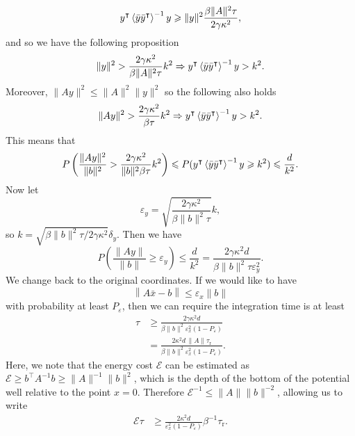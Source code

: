 \documentclass[prx,onecolumn,floatfix,longbibliography,notitlepage, nofootinbib,12pt]{revtex4-2}
\renewcommand{\geq}{\geqslant}
\renewcommand{\leq}{\leqslant}
\begin{document}
\begin{appendix}
\begin{equation}
y^\intercal \braket{\bar{y} \bar{y}^\intercal}^{-1} y \geq \|y\|^2\frac{\beta\|A\|^2\tau}{2 \gamma \kappa^2 },
\end{equation}
and so we have the following proposition
\begin{equation}
    \|y\|^2 > \frac{2 \gamma\kappa^2}{\beta\|A\|^2\tau}k^2 \Rightarrow
    y^\intercal \braket{\bar{y} \bar{y}^\intercal}^{-1}y > k^2.
\end{equation}
Moreover, $\|Ay\|^2 \leq \|A\|^2 \|y\|^2$ so the following also holds
\begin{equation}
    \|A y\|^2 > \frac{2 \gamma\kappa^2}{\beta\tau}k^2 \Rightarrow
    y^\intercal \braket{\bar{y} \bar{y}^\intercal}^{-1}y > k^2.
\end{equation}
This means that 
\begin{equation}
    P\left(  \frac{\|A y\|^2}{\|b\|^2} > \frac{2 \gamma\kappa^2}{\|b\|^2\beta\tau}k^2\right) \leq P( y^\intercal \braket{\bar{y} \bar{y}^\intercal}^{-1}y \geq k^2) \leq \frac{d}{k^2}.
\end{equation}
Now let
\begin{equation}
\varepsilon_y = \sqrt{\frac{2 \gamma \kappa^2}{\beta\|b\|^2\tau}} k,
\end{equation}
so $k = \sqrt{\beta \|b\|^2 \tau/2\gamma \kappa^2}\delta_y$. Then we have
\begin{equation}
    P\left(  \frac{\|A y\|}{\|b\|} \geq \varepsilon_y\right) \leq \frac{d}{k^2} = \frac{2 \gamma \kappa^2d}{\beta \|b\|^2 \tau \varepsilon_y^2}.
\end{equation}
We change back to the original coordinates. If we would like to have
\begin{equation}
    \left \|A \bar{x} - b \right\| \leq \varepsilon_x \|b\| 
\end{equation}
with probability at least $P_\varepsilon$, then we can require the integration time is at least
\begin{align}
    \tau &\geq \frac{2 \gamma\kappa^2 d  }{\beta \|b\|^2 \varepsilon_x^2 (1-P_\varepsilon)} \\
    &=\frac{2 \kappa^2 d\, \|A\| \tau_\text{r} }{\beta \|b\|^2 \varepsilon_x^2 (1-P_\varepsilon)} .
\end{align}
Here, we note that the energy cost $\mathcal{E}$ can be estimated as $\mathcal{E} \geq b^\intercal A^{-1} b \geq \|A\|^{-1}\|b\|^2$, which is the depth of the bottom of the potential well relative to the point $x=0$. Therefore $\mathcal{E}^{-1} \leq \|A\|\|b\|^{-2}$, allowing us to write
\begin{align}
    \mathcal{E}\tau &\geq \frac{2 \kappa^2 d  }{ \varepsilon_x^2 (1-P_\varepsilon)} \beta^{-1}\tau_\text{r}.
\end{align}


\end{appendix}
\end{document}
